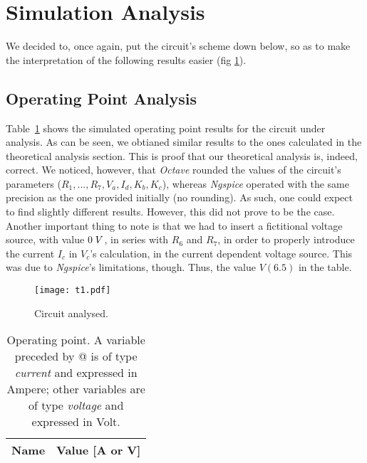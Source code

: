 \section{Simulation Analysis}
\label{sec:simulation}

We decided to, once again, put the circuit's scheme down below, so as to make the interpretation of the following results easier (fig \ref{fig:op}).

\subsection{Operating Point Analysis}

Table~\ref{tab:op} shows the simulated operating point results for the circuit
under analysis. As can be seen, we obtianed similar results to the ones calculated in the theoretical analysis section. This is proof that our theoretical analysis is, indeed, correct.
We noticed, however, that \emph{Octave} rounded the values of the circuit's parameters ($R_{1}, ..., R_{7}, V_{a}, I_{d}, K_{b}, K_{c}$), whereas \emph{Ngspice} operated with the same precision as the one provided initially (no rounding).
As such, one could expect to find slightly different results. However, this did not prove to be the case. Another important thing to note is that we had to insert a fictitional
voltage source, with value $0\hspace{1mm}V$, in series with $R_{6}$ and $R_{7}$, in order to properly introduce the current $I_{c}$ in $V_{c}$'s calculation, in the current dependent
voltage source. This was due to \emph{Ngspice}'s limitations, though. Thus,
the value $V(6.5)$ in the table.

\begin{figure}[h] \centering
  \texttt{[image: t1.pdf]}
  \caption{Circuit analysed.}
  \label{fig:op}
\end{figure}

\begin{table}[h]
  \centering
  \begin{tabular}{|l|r|}
    \hline    
    {\bf Name} & {\bf Value [A or V]} \\ \hline
    
  \end{tabular}
  \caption{Operating point. A variable preceded by @ is of type {\em current}
    and expressed in Ampere; other variables are of type {\it voltage} and expressed in
    Volt.}
  \label{tab:op}
\end{table}
\newpage



